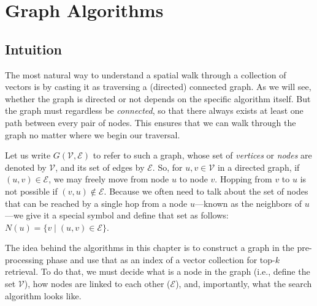 \chapter{Graph Algorithms}
\label{chapter:graph}


\section{Intuition}
\label{section:graph:intuition}

The most natural way to understand a spatial walk through a collection
of vectors is by casting it as traversing a (directed) connected graph.
As we will see, whether the graph is directed or not depends on the specific algorithm itself.
But the graph must regardless be \emph{connected}, so that there always exists at least
one path between every pair of nodes. This ensures that we can walk through the graph
no matter where we begin our traversal.

Let us write $G(\mathcal{V}, \mathcal{E})$ to refer to such a graph,
whose set of \emph{vertices} or \emph{nodes} are denoted by $\mathcal{V}$,
and its set of edges by $\mathcal{E}$.
So, for $u, v \in \mathcal{V}$ in a directed graph,
if $(u, v) \in \mathcal{E}$, we may freely move from node $u$ to node $v$.
Hopping from $v$ to $u$ is not possible if $(v, u) \notin \mathcal{E}$.
Because we often need to talk about the set of nodes that can be reached by a single hop
from a node $u$---known as the neighbors of $u$---we give it a special symbol and
define that set as follows: $N(u) = \{ v \;|\; (u, v) \in \mathcal{E} \}$.

The idea behind the algorithms in this chapter is to construct a graph in the pre-processing phase
and use that as an index of a vector collection for top-$k$ retrieval.
To do that, we must decide what is a node in the graph (i.e., define the set $\mathcal{V}$),
how nodes are linked to each other ($\mathcal{E}$), and, importantly, what the search algorithm looks like.

